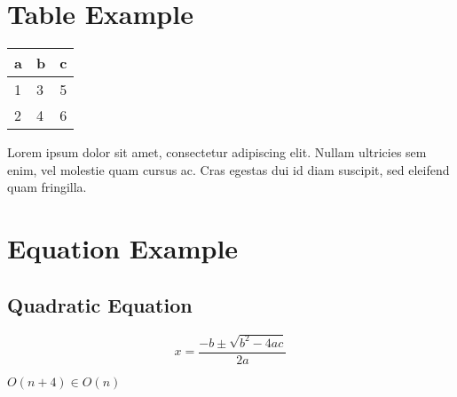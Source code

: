 \documentclass[11pt]{article}
\begin{document}
\section*{Table Example}
\label{sec-4}
\begin{center}
\begin{tabular}{|l|l|l|}
\hline
a & b & c \\
\hline
1 & 3 & 5 \\
2 & 4 & 6 \\
\hline
\end{tabular}
\end{center}
Lorem ipsum dolor sit amet, consectetur adipiscing elit. Nullam ultricies 
sem enim, vel molestie quam cursus ac. Cras egestas dui id diam suscipit, 
sed eleifend quam fringilla.

\section*{Equation Example}
\label{sec-5}
\subsection*{Quadratic Equation}
\label{sec-5-1}
\begin{equation*}
x=\frac{-b \pm \sqrt{b^2 - 4ac}}{2a}
\end{equation*}

\begin{center}
$O(n + 4) \in O(n)$   
\end{center}
\end{document}
